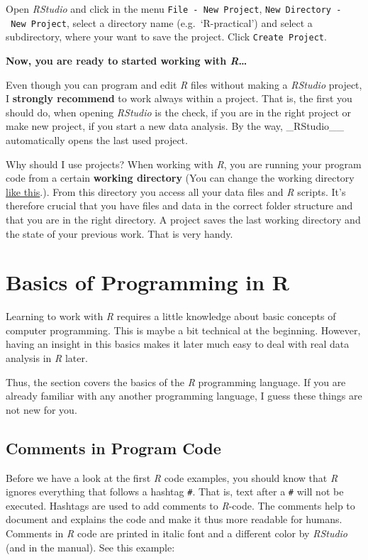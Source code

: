 \documentclass[
]{scrartcl}
\makeatletter
\newenvironment{kframe}{%
\medskip{}
\setlength{\fboxsep}{.8em}
 \def\at@end@of@kframe{}%
 \ifinner\ifhmode%
  \def\at@end@of@kframe{\end{minipage}}%
  \begin{minipage}{\columnwidth}%
 \fi\fi%
 \def\FrameCommand##1{\hskip\@totalleftmargin \hskip-\fboxsep
 \colorbox{shadecolor}{##1}\hskip-\fboxsep
     \hskip-\linewidth \hskip-\@totalleftmargin \hskip\columnwidth}%
 \MakeFramed {\advance\hsize-\width
   \@totalleftmargin\z@ \linewidth\hsize
   \@setminipage}}%
 {\par\unskip\endMakeFramed%
 \at@end@of@kframe}
\newenvironment{rmdblock}[1]
  {
  \begin{itemize}
  \renewcommand{\labelitemi}{
    \raisebox{-.7\height}[0pt][0pt]{
      {\setkeys{Gin}{width=3em,keepaspectratio}\texttt{[image: images/\#1]}}
    }
  }
  \setlength{\fboxsep}{1em}
  \begin{kframe}
  \item
  }
  {
  \end{kframe}
  \end{itemize}
  }
\newenvironment{myexercise}
    {\begin{rmdblock}{exercise_green}}
    {\end{rmdblock}}
\makeatother
\begin{document}
\begin{myexercise}
Open \emph{RStudio} and click in the menu
\texttt{File\ -\ New\ Project},
\texttt{New\ Directory\ -\ New\ Project}, select a directory name
(e.g.~`R-practical') and select a subdirectory, where your want to save
the project. Click \texttt{Create\ Project}.
\end{myexercise}

\textbf{Now, you are ready to started working with \emph{R}\ldots{}}

Even though you can program and edit \emph{R} files without making a \emph{RStudio} project, I \textbf{strongly recommend} to work always within a project. That is, the first you should do, when opening \emph{RStudio} is the check, if you are in the right project or make new project, if you start a new data analysis. By the way, \_RStudio\_\_ automatically opens the last used project.

Why should I use projects? When working with \emph{R}, you are running your program code from a certain \textbf{working directory} (You can change the working directory \href{https://www.youtube.com/watch?v=LNw6hzGgyxM}{like this}.). From this directory you access all your data files and \emph{R} scripts. It's therefore crucial that you have files and data in the correct folder structure and that you are in the right directory. A project saves the last working directory and the state of your previous work. That is very handy.

\section{Basics of Programming in R}\label{basics}

Learning to work with \emph{R} requires a little knowledge about basic concepts of computer programming. This is maybe a bit technical at the beginning. However, having an insight in this basics makes it later much easy to deal with real data analysis in \emph{R} later.

Thus, the section covers the basics of the \emph{R} programming language. If you are already familiar with any another programming language, I guess these things are not new for you.

\subsection{Comments in Program Code}\label{comments-in-program-code}

Before we have a look at the first \emph{R} code examples, you should know that \emph{R} ignores everything that follows a hashtag \texttt{\#}. That is, text after a \texttt{\#} will not be executed. Hashtags are used to add comments to \emph{R}-code. The comments help to document and explains the code and make it thus more readable for humans. Comments in \emph{R} code are printed in italic font and a different color by \emph{RStudio} (and in the manual). See this example:
\end{document}
